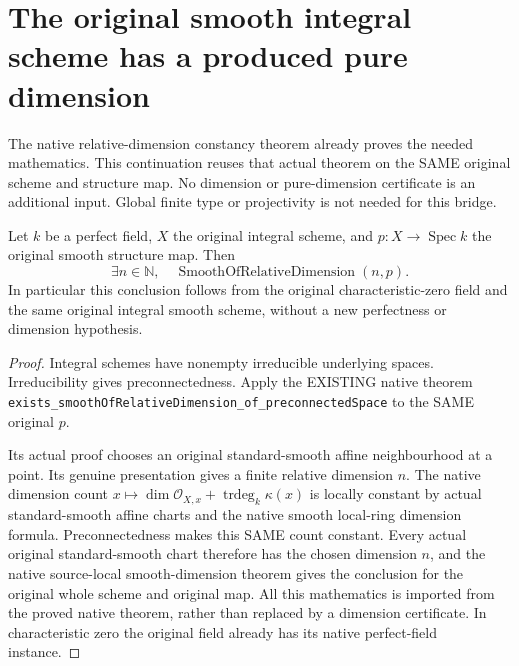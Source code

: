 \section{The original smooth integral scheme has a produced pure dimension}
\label{sec:c0n-smooth-dimension}

The native relative-dimension constancy theorem already proves the needed
mathematics. This continuation reuses that actual theorem on the SAME
original scheme and structure map. No dimension or pure-dimension
certificate is an additional input. Global finite type or projectivity is
not needed for this bridge.

\begin{lemma}
\label{lem:c0n-smooth-integral-pure-dimension}
\leanok
{}
Let $k$ be a perfect field, $X$ the original integral scheme, and
$p:X\to\operatorname{Spec}k$ the original smooth structure map. Then
\[
 \exists n\in\mathbb N,\quad
 \operatorname{SmoothOfRelativeDimension}(n,p).
\]
In particular this conclusion follows from the original characteristic-zero
field and the same original integral smooth scheme, without a new
perfectness or dimension hypothesis.
\end{lemma}
\begin{proof}
Integral schemes have nonempty irreducible underlying spaces. Irreducibility
gives preconnectedness. Apply the EXISTING native theorem
\nolinkurl{exists_smoothOfRelativeDimension_of_preconnectedSpace} to the
SAME original $p$.

Its actual proof chooses an original standard-smooth affine neighbourhood
at a point. Its genuine presentation gives a finite relative dimension
$n$. The native dimension count
$x\mapsto\dim\mathcal O_{X,x}+\operatorname{trdeg}_k\kappa(x)$ is locally
constant by actual standard-smooth affine charts and the native smooth
local-ring dimension formula. Preconnectedness makes this SAME count
constant. Every actual original standard-smooth chart therefore has the
chosen dimension $n$, and the native source-local smooth-dimension theorem
gives the conclusion for the original whole scheme and original map.
All this mathematics is imported from the proved native theorem, rather
than replaced by a dimension certificate. In characteristic zero the
original field already has its native perfect-field instance.
\end{proof}

